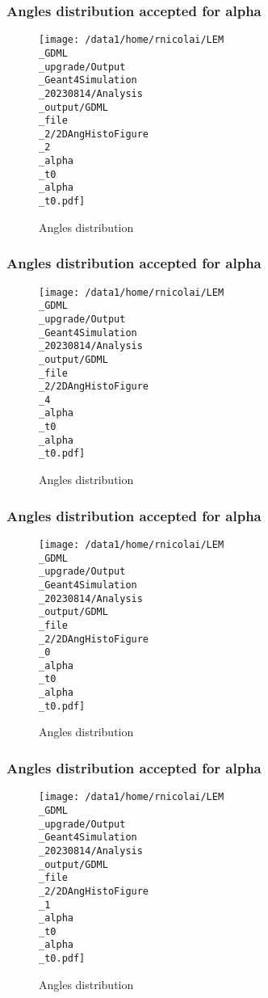 \documentclass[8pt]{beamer}
\begin{document}
            \begin{frame}
                \frametitle{Angles distribution accepted for alpha}
            
        \begin{figure}[h]
            \centering
            \texttt{[image: /data1/home/rnicolai/LEM\\\_GDML\\\_upgrade/Output\\\_Geant4Simulation\\\_20230814/Analysis\\\_output/GDML\\\_file\\\_2/2DAngHistoFigure\\\_2\\\_alpha\\\_t0\\\_alpha\\\_t0.pdf]}
            \caption{Angles distribution}
        \end{figure}
        
            \end{frame}
            
            \begin{frame}
                \frametitle{Angles distribution accepted for alpha}
            
        \begin{figure}[h]
            \centering
            \texttt{[image: /data1/home/rnicolai/LEM\\\_GDML\\\_upgrade/Output\\\_Geant4Simulation\\\_20230814/Analysis\\\_output/GDML\\\_file\\\_2/2DAngHistoFigure\\\_4\\\_alpha\\\_t0\\\_alpha\\\_t0.pdf]}
            \caption{Angles distribution}
        \end{figure}
        
            \end{frame}
            
            \begin{frame}
                \frametitle{Angles distribution accepted for alpha}
            
        \begin{figure}[h]
            \centering
            \texttt{[image: /data1/home/rnicolai/LEM\\\_GDML\\\_upgrade/Output\\\_Geant4Simulation\\\_20230814/Analysis\\\_output/GDML\\\_file\\\_2/2DAngHistoFigure\\\_0\\\_alpha\\\_t0\\\_alpha\\\_t0.pdf]}
            \caption{Angles distribution}
        \end{figure}
        
            \end{frame}
            
            \begin{frame}
                \frametitle{Angles distribution accepted for alpha}
            
        \begin{figure}[h]
            \centering
            \texttt{[image: /data1/home/rnicolai/LEM\\\_GDML\\\_upgrade/Output\\\_Geant4Simulation\\\_20230814/Analysis\\\_output/GDML\\\_file\\\_2/2DAngHistoFigure\\\_1\\\_alpha\\\_t0\\\_alpha\\\_t0.pdf]}
            \caption{Angles distribution}
        \end{figure}
        
            \end{frame}
            
\end{document}
